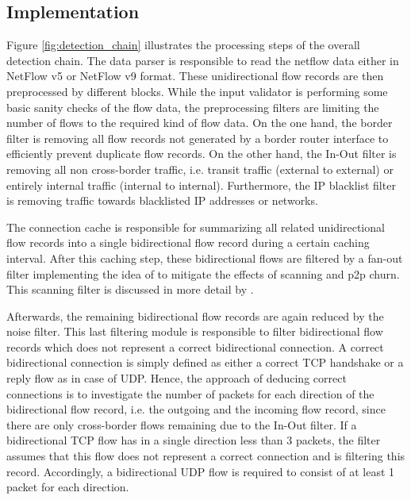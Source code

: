 \subsection{Implementation}
Figure \ref{fig:detection_chain} illustrates the processing steps of the 
overall detection chain. The data parser is responsible to read the netflow data 
either in NetFlow v5 or NetFlow v9 format. These unidirectional flow records are 
then preprocessed by different blocks. While the input validator is performing 
some basic sanity checks of the flow data, the preprocessing filters are 
limiting the number of flows to the required kind of flow data. On the one hand, 
the border filter is removing all flow records not generated by a border router 
interface to efficiently prevent duplicate flow records. On the other hand, the 
In-Out filter is removing all non cross-border traffic, i.e. transit traffic 
(external to external) or entirely internal traffic (internal to internal). 
Furthermore, the IP blacklist filter is removing traffic towards blacklisted IP 
addresses or networks.

The connection cache is responsible for summarizing all related unidirectional 
flow records into a single bidirectional flow record during a certain caching 
interval. After this caching step, these bidirectional flows are filtered by a 
fan-out filter implementing the idea of \citet{Allman:2007} to mitigate the 
effects of scanning and \gls{p2p} churn. This scanning filter is discussed in 
more detail by \citet{Schatzmann:Mining,Schatzmann:Dissection, 
Schatzmann:Tracing}. 

Afterwards, the remaining bidirectional flow records are again reduced by the 
noise filter. This last filtering module is responsible to filter bidirectional 
flow records which does not represent a correct bidirectional connection. A 
correct bidirectional connection is simply defined as either a correct \gls{TCP} 
handshake or a reply flow as in case of \gls{UDP}. 
Hence, the approach of deducing correct connections is to investigate the number 
of packets for each direction of the bidirectional flow record, i.e. the 
outgoing and the incoming flow record, since there are only cross-border flows 
remaining due to the In-Out filter. 
If a bidirectional \gls{TCP} flow has in a single direction less than 3 
packets, the filter assumes that this flow does not represent a correct 
connection and is filtering this record. Accordingly, a bidirectional \gls{UDP} 
flow is required to consist of at least 1 packet for each direction.

